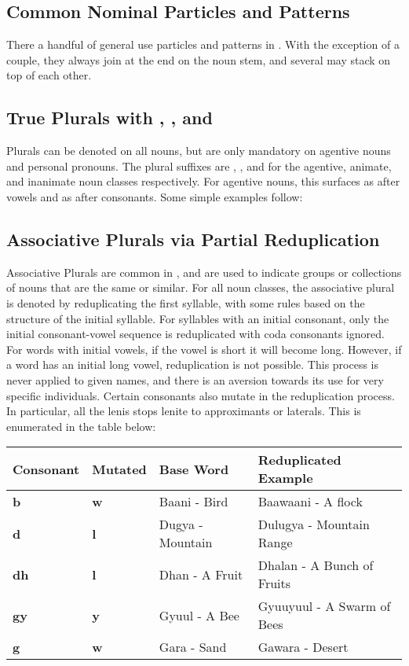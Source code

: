 \subsection{Common Nominal Particles and Patterns}
There a handful of general use particles and patterns in \langname. With the exception of a couple, they always join at the end on the noun stem, and several may stack on top of each other.

  \subsection{True Plurals with \suffixtext{\agtconsplural}, \suffixtext{\animplural}, and \suffixtext{\inanplural}}
  Plurals can be denoted on all nouns, but are only mandatory on agentive nouns and personal pronouns. The plural suffixes are \suffixtext{\agtplural}, \suffixtext{\animplural}, and \suffixtext{\inanplural} for the agentive, animate, and inanimate noun classes respectively. For agentive nouns, this surfaces as \suffixtext{\agtvowelplural} after vowels and as \suffixtext{\agtconsplural} after consonants. Some simple examples follow:


  \subsection{Associative Plurals via Partial Reduplication}
  Associative Plurals are common in \langname, and are used to indicate groups or collections of nouns that are the same or similar. For all noun classes, the associative plural is denoted by reduplicating the first syllable, with some rules based on the structure of the initial syllable. For syllables with an initial consonant, only the initial consonant-vowel sequence is reduplicated with coda consonants ignored. For words with initial vowels, if the vowel is short it will become long. However, if a word has an initial long vowel, reduplication is not possible. This process is never applied to given names, and there is an aversion towards its use for very specific individuals.
  Certain consonants also mutate in the reduplication process. In particular, all the lenis stops lenite to approximants or laterals. This is enumerated in the table below:

  \vertspace
  \begin{tabular}{|l|l|l|l|}
    \hline
    Consonant   & Mutated    & Base Word        & Reduplicated Example         \\ \hline \hline
    \textbf{b}  & \textbf{w} & Baani - Bird     & Baawaani - A flock           \\
    \textbf{d}  & \textbf{l} & Dugya - Mountain & Dulugya  - Mountain Range    \\
    \textbf{dh} & \textbf{l} & Dhan  - A Fruit  & Dhalan   - A Bunch of Fruits \\
    \textbf{gy} & \textbf{y} & Gyuul - A Bee    & Gyuuyuul - A Swarm of Bees   \\
    \textbf{g}  & \textbf{w} & Gara  - Sand     & Gawara   - Desert            \\ \hline
  \end{tabular}
  
